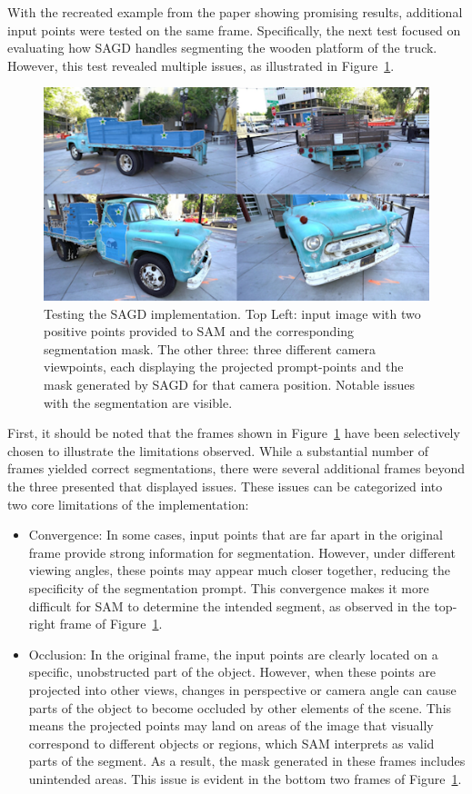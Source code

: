 \documentclass[12pt]{article}
\begin{document}
\FloatBarrier
\noindent
With the recreated example from the paper showing promising results, additional input points were tested on the same frame. Specifically, the next test focused on evaluating how SAGD handles segmenting the wooden platform of the truck. However, this test revealed multiple issues, as illustrated in Figure~\ref{fig:issues}.
\begin{figure}[h!]
	\centering
	\includegraphics[width=\textwidth]{Images/badsagd.png}
	\caption{Testing the SAGD implementation. Top Left: input image with two positive points provided to SAM and the corresponding segmentation mask. The other three: three different camera viewpoints, each displaying the projected prompt-points and the mask generated by SAGD for that camera position. Notable issues with the segmentation are visible.}
	\label{fig:issues}
\end{figure}
\FloatBarrier
\noindent
First, it should be noted that the frames shown in Figure~\ref{fig:issues} have been selectively chosen to illustrate the limitations observed. While a substantial number of frames yielded correct segmentations, there were several additional frames beyond the three presented that displayed issues. These issues can be categorized into two core limitations of the implementation:
\begin{itemize}
	\item Convergence: In some cases, input points that are far apart in the original frame provide strong information for segmentation. However, under different viewing angles, these points may appear much closer together, reducing the specificity of the segmentation prompt. This convergence makes it more difficult for SAM to determine the intended segment, as observed in the top-right frame of Figure~\ref{fig:issues}.
	\item Occlusion: In the original frame, the input points are clearly located on a specific, unobstructed part of the object. However, when these points are projected into other views, changes in perspective or camera angle can cause parts of the object to become occluded by other elements of the scene. This means the projected points may land on areas of the image that visually correspond to different objects or regions, which SAM interprets as valid parts of the segment. As a result, the mask generated in these frames includes unintended areas. This issue is evident in the bottom two frames of Figure~\ref{fig:issues}.
\end{itemize}
\end{document}
